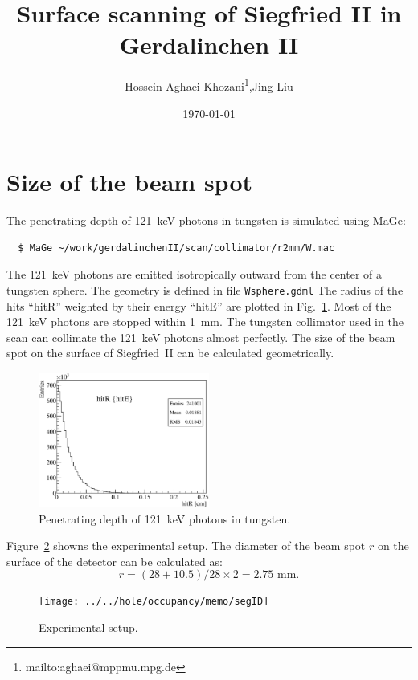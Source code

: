 \documentclass[12pt, a4paper]{article}
\title{Surface scanning of Siegfried II in Gerdalinchen II}
\author{Hossein Aghaei-Khozani\thanks{mailto:aghaei@mppmu.mpg.de},Jing Liu}
\date{\today{}}
\begin{document}
\maketitle{}
\tableofcontents

\section{Size of the beam spot}
\label{s:col}
The penetrating depth of 121~keV photons in tungsten is simulated
using MaGe:
\begin{lstlisting}
  $ MaGe ~/work/gerdalinchenII/scan/collimator/r2mm/W.mac
\end{lstlisting}
The 121~keV photons are emitted isotropically outward from the center
of a tungsten sphere. The geometry is defined in file
\lstinline!Wsphere.gdml! The radius of the hits ``hitR'' weighted by
their energy ``hitE'' are plotted in Fig.~\ref{f:w121}. Most of the
121~keV photons are stopped within 1~mm. The tungsten collimator used
in the scan can collimate the 121~keV photons almost perfectly. The
size of the beam spot on the surface of Siegfried~II can be calculated
geometrically. 

\begin{figure}[fptb]
  \centering
  \includegraphics[width=0.5\textwidth]{w121keV}
  \caption{Penetrating depth of 121~keV photons in tungsten.}
  \label{f:w121}
\end{figure}

Figure~\ref{f:setup} showns the experimental setup. The diameter of
the beam spot $r$ on the surface of the detector can be calculated as:
\begin{equation}
  \label{e:size}
  r = (28+10.5)/28 \times 2 = 2.75 \text{ mm}.
\end{equation}

\begin{figure}[fptb]
  \centering
  \texttt{[image: ../../hole/occupancy/memo/segID]}
  \caption{Experimental setup.}
  \label{f:setup}
\end{figure}
\end{document}
